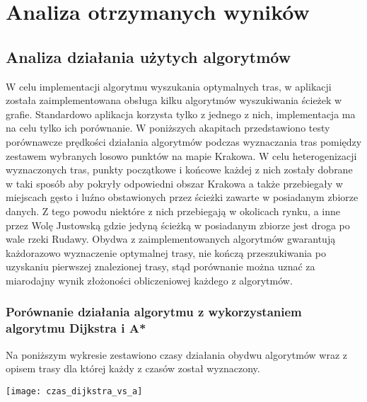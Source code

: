 \chapter{Analiza otrzymanych wyników}
\label{cha:analiza_otrzymanych_wynikow}


\section{Analiza działania użytych algorytmów}

W celu implementacji algorytmu wyszukania optymalnych tras, w aplikacji została zaimplementowana obsługa kilku algorytmów wyszukiwania ścieżek w grafie. Standardowo aplikacja korzysta tylko z jednego z nich, implementacja ma na celu tylko ich porównanie. W poniższych akapitach przedstawiono testy porównawcze prędkości działania algorytmów podczas wyznaczania tras pomiędzy zestawem wybranych losowo punktów na mapie Krakowa. 
W celu heterogenizacji wyznaczonych tras, punkty początkowe i końcowe każdej z nich zostały dobrane w taki sposób aby pokryły odpowiedni obszar Krakowa a także przebiegały w miejscach gęsto i luźno obstawionych przez ścieżki zawarte w posiadanym zbiorze danych. Z tego powodu niektóre z nich przebiegają w okolicach rynku, a inne przez Wolę Justowską gdzie jedyną ścieżką w posiadanym zbiorze jest droga po wale rzeki Rudawy.
Obydwa z zaimplementowanych algorytmów gwarantują każdorazowo wyznaczenie optymalnej trasy, nie kończą przeszukiwania po uzyskaniu pierwszej znalezionej trasy, stąd porównanie można uznać za miarodajny wynik złożoności obliczeniowej każdego z algorytmów.

\subsection{Porównanie działania algorytmu z wykorzystaniem algorytmu Dijkstra i A*}

Na poniższym wykresie zestawiono czasy działania obydwu algorytmów wraz z opisem trasy dla której każdy z czasów został wyznaczony.

\texttt{[image: czas\_dijkstra\_vs\_a]}

